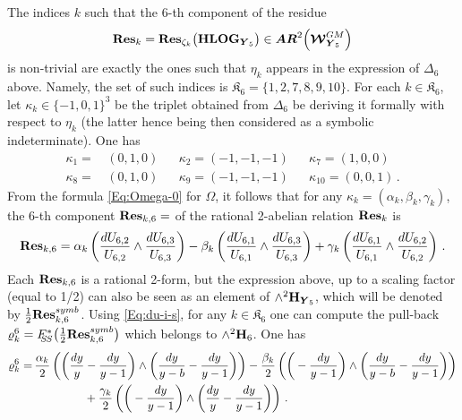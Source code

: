 \documentclass[11pt]{amsart}
\begin{document}
The indices $k$ such that the $6$-th component of the residue 
$${\bf Res}_k
={\bf Res}_{\zeta_k}\big({\bf HLOG}_{\boldsymbol{Y}_5} \big) 
\in \boldsymbol{AR}^2\Big( 
\boldsymbol{\mathcal W}_{\boldsymbol{Y}_5}^{GM}
\Big)$$  is non-trivial are exactly the ones such that $\eta_k$ appears in the expression of $\Delta_6$ above. Namely, the set of such indices is $\mathfrak K_6=\{1,2,7,8,9,10\}$. For each $k\in \mathfrak K_6$, let $\kappa_k\in \{-1,0,1\}^3$ be the triplet obtained from $\Delta_6$ be deriving it formally with respect to $\eta_k$ (the latter hence being 
then considered as a symbolic indeterminate). One has 
\begin{align*}
\kappa_1= & \, (0, 1, 0)
&& \kappa_2=(-1, -1, -1) 
&& \kappa_7=(1, 0, 0) 
\\
\kappa_8= & \, (0, 1, 0)
&& \kappa_9=(-1, -1, -1) 
&& \kappa_{10}=(0, 0, 1)\, . 
\end{align*}
From the formula \eqref{Eq:Omega-0} for $\Omega$, it follows that 
for any $\kappa_k=(\alpha_k,\beta_k,\gamma_k)$, the $6$-th component 
${\bf Res}_{k,6}=$
of  the 
rational 2-abelian relation 
${\bf Res}_k$ is 
$${\bf Res}_{k,6}= \alpha_k \left( \frac{dU_{6,2}}{U_{6,2}}\wedge 
\frac{dU_{6,3}}{U_{6,3}}
\right) 
-\beta_k  \left(
\frac{dU_{6,1}}{U_{6,1}}\wedge 
\frac{dU_{6,3}}{U_{6,3}}\right) 
+\gamma_k \left( \frac{dU_{6,1}}{U_{6,1}}\wedge 
\frac{dU_{6,2}}{U_{6,2}}\right)  \, .$$
Each ${\bf Res}_{k,6}$ is a rational 2-form, but the expression above, up to a scaling factor (equal to 1/2) can also be seen as an element of $\wedge^2 {\bf H}_{\boldsymbol{Y}_5}$, which will be denoted by $\frac12 {\bf Res}_{k,6}^{symb}$. 
Using \eqref{Eq:du-i-s}, for any $k\in {\mathfrak K}_6$ one can compute the pull-back  $ 
\varrho_k^6=
F_{\hspace{-0.05cm} 
\hspace{-0.08cm}
S\hspace{-0.03cm}S}^*\big( \frac12  {\bf Res}_{k,6}^{symb}\big)$ which belongs to $\wedge^2 {\bf H}_6$. 
One has 
\begin{align*}%
\varrho_k^6 = &\, \frac{\alpha_k}{2} \left(
\bigg(  \frac{dy}{y}- \frac{dy}{y-1}
\bigg)
\wedge 
\bigg(  \frac{dy}{y-b}- \frac{dy}{y-1}
\bigg)
\right) 
 -
 \frac{\beta_k}{2}  \left(
\bigg(  -\frac{dy}{y-1} \bigg)
\wedge 
\bigg(  \frac{dy}{y-b}- \frac{dy}{y-1}
\bigg)
\right) \\
&\, \hspace{1.5cm}+
 \frac{\gamma_k}{2}
 \left( 
\bigg(  -\frac{dy}{y-1} \bigg)
\wedge 
\bigg(  \frac{dy}{y}- \frac{dy}{y-1}
\bigg)
\right)  \, .
\end{align*}%
\end{document}
